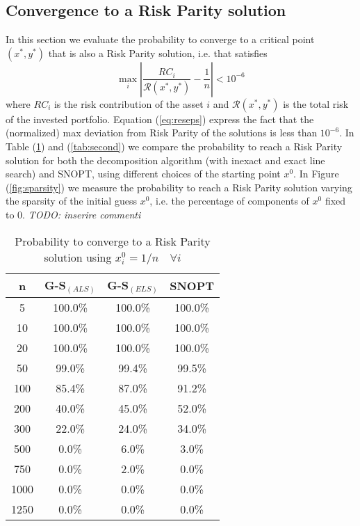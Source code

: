 \subsection{Convergence to a Risk Parity solution}
In this section we evaluate the probability to converge to a critical point $(x^*,y^*)$ that is also a Risk Parity solution, i.e. that satisfies 
\begin{equation}\label{eq:reseps}
\max_i \left| \frac{RC_i}{\mathcal{R}(x^*,y^*)} - \frac{1}{n} \right| < 10^{-6}
\end{equation}
where $RC_i$ is the risk contribution of the asset $i$ and ${\mathcal{R}(x^*,y^*)}$ is the total risk of the invested portfolio. Equation (\ref{eq:reseps}) express the fact that the (normalized) max deviation from Risk Parity of the solutions is less than $10^{-6}$. In Table (\ref{tab:first}) and (\ref{tab:second}) we compare the probability to reach a Risk Parity solution for both the decomposition algorithm (with inexact and exact line search) and SNOPT, using different choices of the starting point $x^0$. In Figure (\ref{fig:sparsity}) we measure the probability to reach a Risk Parity solution varying the sparsity of the initial guess $x^0$, i.e. the percentage of components of $x^0$ fixed to 0. \textit{TODO: inserire commenti}
\begin{table}
\centering
\begin{tabular}{ c | c | c | c }
n &  G-S$_{(ALS)}$ & G-S$_{(ELS)}$  & SNOPT \\\hline
5    & 100.0\% & 100.0\% & 100.0\%\\\hline
10   & 100.0\% & 100.0\% & 100.0\%\\\hline
20   & 100.0\% & 100.0\% & 100.0\%\\\hline
50   & 99.0\%  & 99.4\%  & 99.5\%\\\hline
100  & 85.4\%  & 87.0\%  & 91.2\%\\\hline
200  & 40.0\%  & 45.0\%  & 52.0\%\\\hline
300  & 22.0\%  & 24.0\%  & 34.0\%\\\hline
500  & 0.0\%   & 6.0\%   & 3.0\%\\\hline
750  & 0.0\%   & 2.0\%   & 0.0\%\\\hline
1000 & 0.0\%   & 0.0\%   & 0.0\%\\\hline
1250 & 0.0\%   & 0.0\%   & 0.0\%\\\hline
\end{tabular}
\caption{Probability to converge to a Risk Parity solution using $x^{0}_i = 1/n \quad \forall i$}
\label{tab:first}
\end{table}


